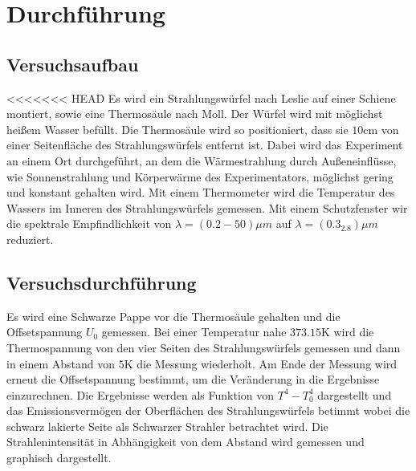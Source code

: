 \section{Durchführung}
\label{sec:Durchführung}
\subsection{Versuchsaufbau}
<<<<<<< HEAD
Es wird ein Strahlungswürfel nach Leslie auf einer Schiene montiert, sowie eine
Thermosäule nach Moll. Der Würfel wird mit möglichst heißem Wasser befüllt. Die
Thermosäule wird so positioniert, dass sie $10\si{\centi\meter}$ von einer
Seitenfläche des Strahlungswürfels entfernt ist. Dabei wird das Experiment an
einem Ort durchgeführt, an dem die Wärmestrahlung durch Außeneinflüsse, wie
Sonnenstrahlung und Körperwärme des Experimentators, möglichst gering und konstant
gehalten wird. Mit einem Thermometer wird die Temperatur des Wassers im Inneren
des Strahlungswürfels gemessen. Mit einem Schutzfenster wir die spektrale
Empfindlichkeit von $\lambda=(0.2-50)\mu m$ auf $\lambda=(0.3_2.8)\mu m$ reduziert.

\subsection{Versuchsdurchführung}
Es wird eine Schwarze Pappe vor die Thermosäule gehalten und die Offsetspannung
$U_0$ gemessen.
Bei einer Temperatur nahe $373.15\si{\kelvin}$ wird die Thermospannung von den vier
Seiten des Strahlungswürfels gemessen und dann in einem Abstand von $5\si{\kelvin}$ die
Messung wiederholt. Am Ende der Messung wird erneut die Offsetspannung bestimmt,
um die Veränderung in die Ergebnisse einzurechnen. Die Ergebnisse werden als
Funktion von $T^4-T_0^4$ dargestellt und das Emissionsvermögen der Oberflächen
des Strahlungswürfels betimmt wobei die schwarz lakierte Seite als
Schwarzer Strahler betrachtet wird.
Die Strahlenintensität in Abhängigkeit von dem Abstand wird gemessen und
graphisch dargestellt.
